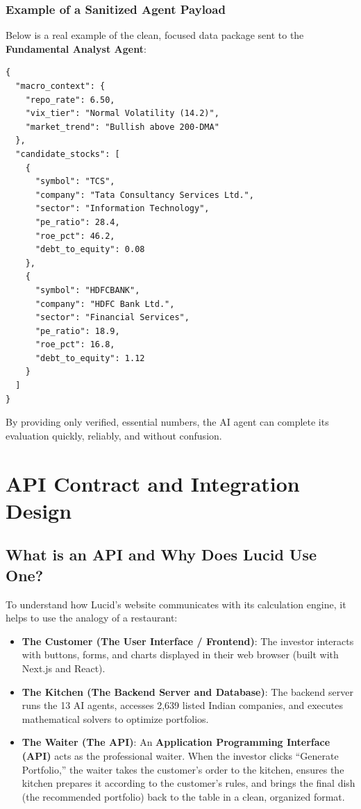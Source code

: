 \subsubsection{Example of a Sanitized Agent Payload}
Below is a real example of the clean, focused data package sent to the \textbf{Fundamental Analyst Agent}:

\begin{footnotesize}
\begin{verbatim}
{
  "macro_context": {
    "repo_rate": 6.50,
    "vix_tier": "Normal Volatility (14.2)",
    "market_trend": "Bullish above 200-DMA"
  },
  "candidate_stocks": [
    {
      "symbol": "TCS",
      "company": "Tata Consultancy Services Ltd.",
      "sector": "Information Technology",
      "pe_ratio": 28.4,
      "roe_pct": 46.2,
      "debt_to_equity": 0.08
    },
    {
      "symbol": "HDFCBANK",
      "company": "HDFC Bank Ltd.",
      "sector": "Financial Services",
      "pe_ratio": 18.9,
      "roe_pct": 16.8,
      "debt_to_equity": 1.12
    }
  ]
}
\end{verbatim}
\end{footnotesize}

By providing only verified, essential numbers, the AI agent can complete its evaluation quickly, reliably, and without confusion.

\section{API Contract and Integration Design}
\label{sec:api_contract}

\subsection{What is an API and Why Does Lucid Use One?}
To understand how Lucid's website communicates with its calculation engine, it helps to use the analogy of a restaurant:
\begin{itemize}
    \item \textbf{The Customer (The User Interface / Frontend)}: The investor interacts with buttons, forms, and charts displayed in their web browser (built with Next.js and React).
    \item \textbf{The Kitchen (The Backend Server and Database)}: The backend server runs the 13 AI agents, accesses 2,639 listed Indian companies, and executes mathematical solvers to optimize portfolios.
    \item \textbf{The Waiter (The API)}: An \textbf{Application Programming Interface (API)} acts as the professional waiter. When the investor clicks ``Generate Portfolio,'' the waiter takes the customer's order to the kitchen, ensures the kitchen prepares it according to the customer's rules, and brings the final dish (the recommended portfolio) back to the table in a clean, organized format.
\end{itemize}

